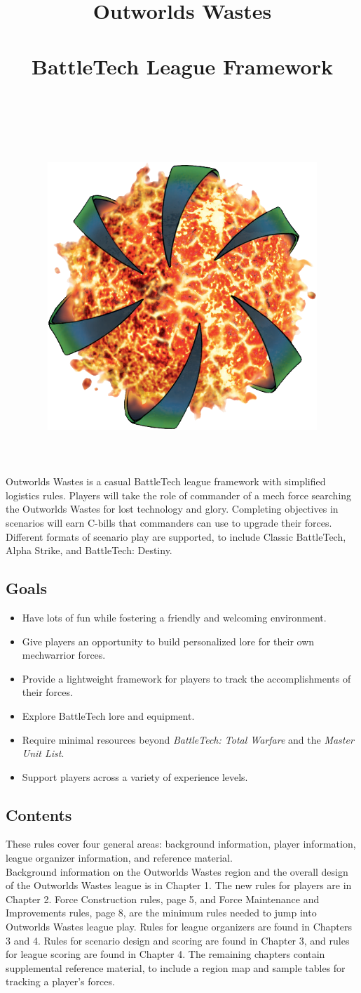 \documentclass[UTF8]{article}
\title{
  Outworlds Wastes\\
  ~\\
  \large BattleTech League Framework \\
  ~\\
  ~\\
  ~\\
  \includegraphics[width=4in]{../img/Outworlds_Alliance.png}
}
\author{}
\date{}
\begin{document}
\maketitle

\newpage

Outworlds Wastes is a casual BattleTech league framework with simplified logistics rules.
Players will take the role of commander of a mech force searching the Outworlds Wastes for lost technology and glory.
Completing objectives in scenarios will earn C-bills that commanders can use to upgrade their forces.
Different formats of scenario play are supported, to include Classic BattleTech, Alpha Strike, and BattleTech: Destiny.\\

\subsection*{Goals}

\begin{itemize}

\item Have lots of fun while fostering a friendly and welcoming environment.

\item Give players an opportunity to build personalized lore for their own mechwarrior forces.

\item Provide a lightweight framework for players to track the accomplishments of their forces.

\item Explore BattleTech lore and equipment.

\item Require minimal resources beyond \emph{BattleTech: Total Warfare} and the \emph{Master Unit List}.

\item Support players across a variety of experience levels.

\end{itemize}

\subsection*{Contents}

These rules cover four general areas: background information, player information, league organizer information, and reference material.\\

Background information on the Outworlds Wastes region and the overall design of the Outworlds Wastes league is in Chapter 1.
The new rules for players are in Chapter 2.
Force Construction rules, page 5, and Force Maintenance and Improvements rules, page 8, are the minimum rules needed to jump into Outworlds Wastes league play.
Rules for league organizers are found in Chapters 3 and 4.
Rules for scenario design and scoring are found in Chapter 3, and rules for league scoring are found in Chapter 4.
The remaining chapters contain supplemental reference material, to include a region map and sample tables for tracking a player's forces.\\
\end{document}
